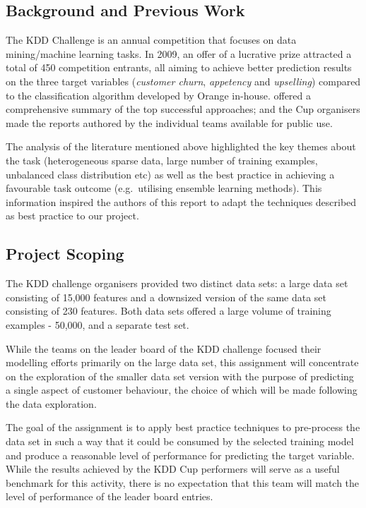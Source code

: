 \documentclass{article}
\begin{document}
\subsection{Background and Previous Work}

The KDD Challenge is an annual competition that focuses on data mining/machine learning tasks.
In 2009, an offer of a lucrative prize attracted a total of 450 competition entrants, all aiming to achieve better prediction results on the three target variables (\emph{customer churn}, \emph{appetency} and \emph{upselling}) compared to the classification algorithm developed by Orange in-house.
\cite{guyon2009analysis} offered a comprehensive summary of the top successful approaches; and the Cup organisers made the reports authored by the individual teams available for public use. 

The analysis of the literature mentioned above highlighted the key themes about the task (heterogeneous sparse data, large number of training examples, unbalanced class distribution etc) as well as the best practice in achieving a favourable task outcome (e.g.\ utilising ensemble learning methods).
This information inspired the authors of this report to adapt the techniques described as best practice to our project.

\subsection{Project Scoping}

The KDD challenge organisers provided two distinct data sets: a large data set consisting of 15,000 features and a downsized version of the same data set consisting of 230 features.
Both data sets offered a large volume of training examples - 50,000, and a separate test set. 

While the teams on the leader board of the KDD challenge focused their modelling efforts primarily on the large data set, this assignment will concentrate on the exploration of the smaller data set version with the purpose of predicting a single aspect of customer behaviour, the choice of which will be made following the data exploration.

The goal of the assignment is to apply best practice techniques to pre-process the data set in such a way that it could be consumed by the selected training model and produce a reasonable level of performance for predicting the target variable.
While the results achieved by the KDD Cup performers will serve as a useful benchmark for this activity, there is no expectation that this team will match the level of performance of the leader board entries.
\end{document}

